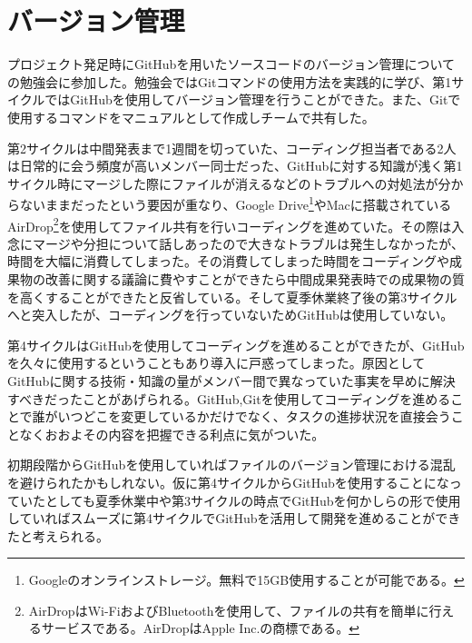 \section{バージョン管理}
プロジェクト発足時にGitHubを用いたソースコードのバージョン管理についての勉強会に参加した。勉強会ではGitコマンドの使用方法を実践的に学び、第1サイクルではGitHubを使用してバージョン管理を行うことができた。また、Gitで使用するコマンドをマニュアルとして作成しチームで共有した。
\par 第2サイクルは中間発表まで1週間を切っていた、コーディング担当者である2人は日常的に会う頻度が高いメンバー同士だった、GitHubに対する知識が浅く第1サイクル時にマージした際にファイルが消えるなどのトラブルへの対処法が分からないままだったという要因が重なり、Google Drive\footnote{Googleのオンラインストレージ。無料で15GB使用することが可能である。}やMacに搭載されているAirDrop\footnote{AirDropはWi-FiおよびBluetoothを使用して、ファイルの共有を簡単に行えるサービスである。AirDropはApple Inc.の商標である。}を使用してファイル共有を行いコーディングを進めていた。その際は入念にマージや分担について話しあったので大きなトラブルは発生しなかったが、時間を大幅に消費してしまった。その消費してしまった時間をコーディングや成果物の改善に関する議論に費やすことができたら中間成果発表時での成果物の質を高くすることができたと反省している。そして夏季休業終了後の第3サイクルへと突入したが、コーディングを行っていないためGitHubは使用していない。
\par 第4サイクルはGitHubを使用してコーディングを進めることができたが、GitHubを久々に使用するということもあり導入に戸惑ってしまった。原因としてGitHubに関する技術・知識の量がメンバー間で異なっていた事実を早めに解決すべきだったことがあげられる。GitHub,Gitを使用してコーディングを進めることで誰がいつどこを変更しているかだけでなく、タスクの進捗状況を直接会うことなくおおよその内容を把握できる利点に気がついた。
\par  初期段階からGitHubを使用していればファイルのバージョン管理における混乱を避けられたかもしれない。仮に第4サイクルからGitHubを使用することになっていたとしても夏季休業中や第3サイクルの時点でGitHubを何かしらの形で使用していればスムーズに第4サイクルでGitHubを活用して開発を進めることができたと考えられる。
